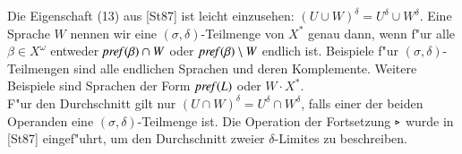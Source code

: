 Die Eigenschaft (13) aus [St87] ist leicht einzusehen: $(U \cup W)^\delta = U^\delta \cup W^\delta$.	Eine Sprache $W$ nennen wir eine $(\sigma,\delta)$-Teilmenge von $X^*$ genau dann, wenn f"ur alle $\beta \in X^\omega$ entweder $\mathit{pref{(}}\beta)\cap W$ oder $\mathit{pref{(}}\beta)\setminus W$ endlich ist.
Beispiele f"ur $(\sigma,\delta)$-Teilmengen sind alle endlichen Sprachen und deren Komplemente. Weitere Beispiele sind Sprachen der Form $\mathit{pref{(}}L)$ oder $W\cdot X^*$.\\
F"ur den Durchschnitt gilt nur $(U\cap W)^\delta = U^\delta \cap W^\delta$, falls einer der beiden Operanden eine $(\sigma,\delta)$-Teilmenge ist.
Die Operation der Fortsetzung $\triangleright$ wurde in [St87] eingef"uhrt, um den Durchschnitt zweier $\delta$-Limites zu beschreiben.
